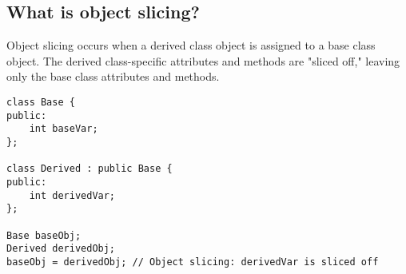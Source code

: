\subsection{What is object slicing?}
Object slicing occurs when a derived class object is assigned to a base class object. The derived class-specific attributes and methods are "sliced off," leaving only the base class attributes and methods.
\begin{tcolorbox}[title=Object Slicing]
\begin{verbatim}
class Base {
public:
    int baseVar;
};

class Derived : public Base {
public:
    int derivedVar;
};

Base baseObj;
Derived derivedObj;
baseObj = derivedObj; // Object slicing: derivedVar is sliced off
\end{verbatim}
\end{tcolorbox}


